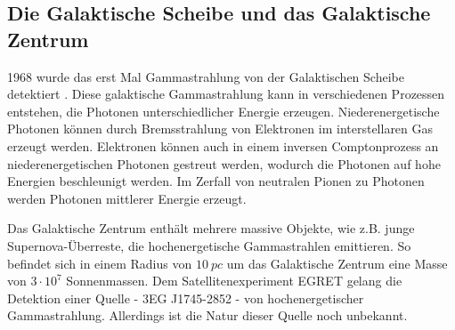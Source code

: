 \subsection{Die Galaktische Scheibe und das Galaktische Zentrum}
1968 wurde das erst Mal Gammastrahlung von der Galaktischen Scheibe detektiert \cite{GalacticPlane}.
Diese galaktische Gammastrahlung kann in verschiedenen Prozessen entstehen, die Photonen unterschiedlicher Energie erzeugen.
Niederenergetische Photonen können durch Bremsstrahlung von Elektronen im interstellaren Gas erzeugt werden.
Elektronen können auch in einem inversen Comptonprozess an niederenergetischen Photonen gestreut werden, wodurch die Photonen auf hohe Energien beschleunigt werden.
Im Zerfall von neutralen Pionen zu Photonen werden Photonen mittlerer Energie erzeugt.





Das Galaktische Zentrum enthält mehrere massive Objekte, wie z.B. junge Supernova-Überreste, die hochenergetische Gammastrahlen emittieren.
So befindet sich in einem Radius von $\SI{10}{pc}$ um das Galaktische Zentrum eine Masse von $3\cdot 10^7$ Sonnenmassen. 
Dem Satellitenexperiment EGRET gelang die Detektion einer Quelle - 3EG J1745-2852 - von hochenergetischer Gammastrahlung.
Allerdings ist die Natur dieser Quelle noch unbekannt.\cite{GalacticCenter}\cite{Weekes}





